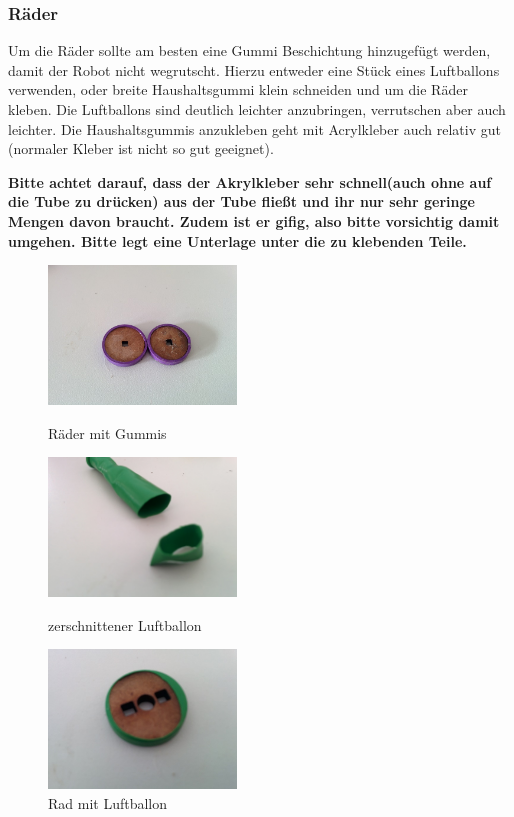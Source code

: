 \documentclass[12pt,a4paper]{article}
\begin{document}
\subsubsection{Räder}
Um die Räder sollte am besten eine Gummi Beschichtung hinzugefügt werden, damit der Robot nicht wegrutscht. Hierzu entweder eine Stück eines Luftballons verwenden, oder breite Haushaltsgummi klein schneiden und um die Räder kleben. Die Luftballons sind deutlich leichter anzubringen, verrutschen aber auch leichter. Die Haushaltsgummis anzukleben geht mit Acrylkleber auch relativ gut (normaler Kleber ist nicht so gut geeignet).

\noindent\textbf{\danger Bitte achtet darauf, dass der Akrylkleber sehr schnell(auch ohne auf die Tube zu drücken) aus der Tube fließt und ihr nur sehr geringe Mengen davon braucht. Zudem ist er gifig, also bitte vorsichtig damit umgehen. Bitte legt eine Unterlage unter die zu klebenden Teile.}

\begin{figure}[h]
	\begin{minipage}{0.33\textwidth}
		\includegraphics[width=5cm]{./graphics/raeder_gummi}
		\caption{Räder mit Gummis}
	\end{minipage}
	\begin{minipage}{0.33\textwidth}
		\includegraphics[width=5cm]{./graphics/luftballon}
		\caption{zerschnittener Luftballon}
	\end{minipage}
	\begin{minipage}{0.33\textwidth}
		\includegraphics[width=5cm]{./graphics/rad_luftballon}
		\caption{Rad mit Luftballon}
	\end{minipage}
\end{figure}
\end{document}
